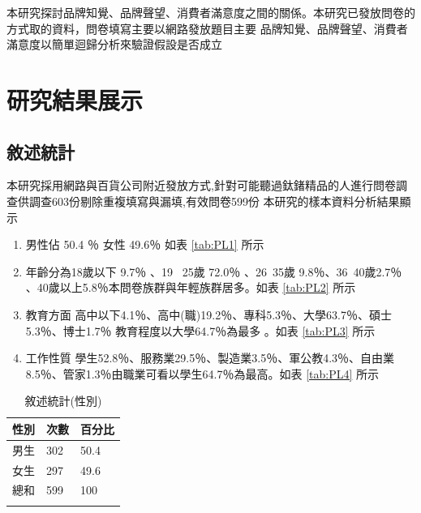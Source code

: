 本研究探討品牌知覺、品牌聲望、消費者滿意度之間的關係。本研究已發放問卷的方式取的資料，問卷填寫主要以網路發放題目主要
品牌知覺、品牌聲望、消費者滿意度以簡單迴歸分析來驗證假設是否成立

\chapter{研究結果展示}
\section{敘述統計}
本研究採用網路與百貨公司附近發放方式,針對可能聽過鈦鍺精品的人進行問卷調查供調查603份剔除重複填寫與漏填,有效問卷599份 
本研究的樣本資料分析結果顯示 
\begin{enumerate}
\item 男性佔 50.4 ％ 女性 49.6％ 如表 \ref{tab:PL1} 所示 
\item 年齡分為18歲以下 9.7％ 、19 ~25歲 72.0％ 、26~35歲 9.8％、36~40歲2.7％ 、40歲以上5.8％本問卷族群與年輕族群居多。如表  \ref{tab:PL2} 所示
\item 教育方面 高中以下4.1％、高中(職)19.2％、專科5.3％、大學63.7％、碩士5.3％、博士1.7％ 教育程度以大學64.7％為最多 。如表 \ref{tab:PL3} 所示
\item 工作性質 學生52.8％、服務業29.5％、製造業3.5％、軍公教4.3％、自由業8.5％、管家1.3％由職業可看以學生64.7％為最高。如表 \ref{tab:PL4} 所示
\end{enumerate}

\begin{table}[htb]
\caption{敘述統計(性別)}
\label{tab:PL1}
\renewcommand{\arraystretch}{1.2} %
\arrayrulewidth=1pt               %
\tabcolsep=60pt                   %
%
\begin{tabular}[t]{lll}  %
\hline
 性別&次數 & 百分比 \\
\hline
男生        & 302 & 50.4 \\
女生        & 297  & 49.6 \\
總和        & 599  & 100 \\
\hline
\centering
\label{fig:PL4}
\end{tabular}
\end{table}

